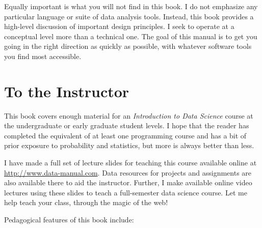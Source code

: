 \documentclass[10pt]{article}
\begin{document}
Equally important is what you will not find in this book. I do not emphasize any particular language or suite of data analysis tools. Instead, this book provides a high-level discussion of important design principles. I seek to operate at a conceptual level more than a technical one. The goal of this manual is to get you going in the right direction as quickly as possible, with whatever software tools you find most accessible.

\section*{To the Instructor}
This book covers enough material for an \textit{Introduction to Data Science} course at the undergraduate or early graduate student levels. I hope that the reader has completed the equivalent of at least one programming course and has a bit of prior exposure to probability and statistics, but more is always better than less.

I have made a full set of lecture slides for teaching this course available online at \href{http://www.data-manual.com}{http://www.data-manual.com}. Data resources for projects and assignments are also available there to aid the instructor. Further, I make available online video lectures using these slides to teach a full-semester data science course. Let me help teach your class, through the magic of the web!

Pedagogical features of this book include:
\end{document}
